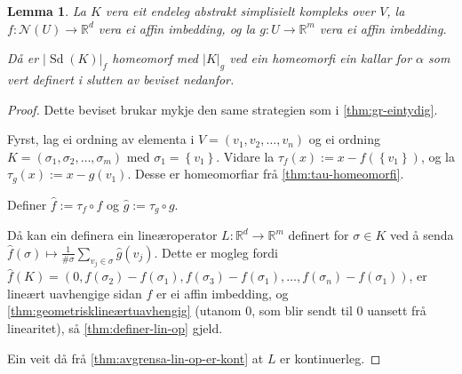\documentclass[a4paper, 12pt, norsk]{article}
\theoremstyle{plain}
\newtheorem{lemma}[theorem]{Lemma}
\theoremstyle{definition}
\newcommand{\Rb}{\mathbb{R}}
\newcommand{\Nc}{\mathcal{N}}
\newcommand{\gr}[1]{ \lvert #1 \rvert } %
\newcommand{\set}[1]{ \left\{ #1 \right\} } %
\DeclareMathOperator{\Sd}{Sd} %
\begin{document}
\begin{lemma} \label{thm:alpha-homeomorfi}
	La \( K \) vera eit endeleg abstrakt simplisielt kompleks over \( V \), la \( f: \Nc(U) \to \Rb^d \) vera ei affin imbedding, og la \( g: U \to \Rb^m \) vera ei affin imbedding.
	
	Då er \( \gr{\Sd(K)}_f  \) homeomorf med \( \gr{K}_g \) ved ein homeomorfi ein kallar for \( \alpha \) som vert definert i slutten av beviset nedanfor.
\end{lemma}

\begin{proof}
	Dette beviset brukar mykje den same strategien som i \autoref{thm:gr-eintydig}.

	Fyrst, lag ei ordning av elementa i \( V = (v_1, v_2, \dots, v_n) \) og ei ordning \( K = (\sigma_1, \sigma_2, \dots, \sigma_m) \) med \( \sigma_1 = \set{v_1} \). Vidare la \( \tau_f(x) := x-f(\set{v_1}) \), og la \( \tau_g(x) := x-g(v_1) \). Desse er homeomorfiar frå \autoref{thm:tau-homeomorfi}.

	Definer \( \hat{f} := \tau_f \circ f \) og \( \hat{g} := \tau_g \circ g \).

	Då kan ein definera ein lineæroperator \( L: \Rb^d \to \Rb^m \) definert for \( \sigma \in K \) ved å senda \( \hat{f}(\sigma) \mapsto \frac{1}{\#\sigma}\sum_{v_j \in \sigma} \hat{g}(v_j) \). Dette er mogleg fordi \( \hat{f}(K) = (0, f(\sigma_2)-f(\sigma_1), f(\sigma_3)-f(\sigma_1), \dots, f(\sigma_n)-f(\sigma_1) ) \), er lineært uavhengige sidan \( f \) er ei affin imbedding, og \autoref{thm:geometrisklineærtuavhengig} (utanom \( 0 \), som blir sendt til \( 0 \) uansett frå linearitet), så \autoref{thm:definer-lin-op} gjeld.

	Ein veit då frå \autoref{thm:avgrensa-lin-op-er-kont} at \( L \) er kontinuerleg. 


\end{proof}
\end{document}
